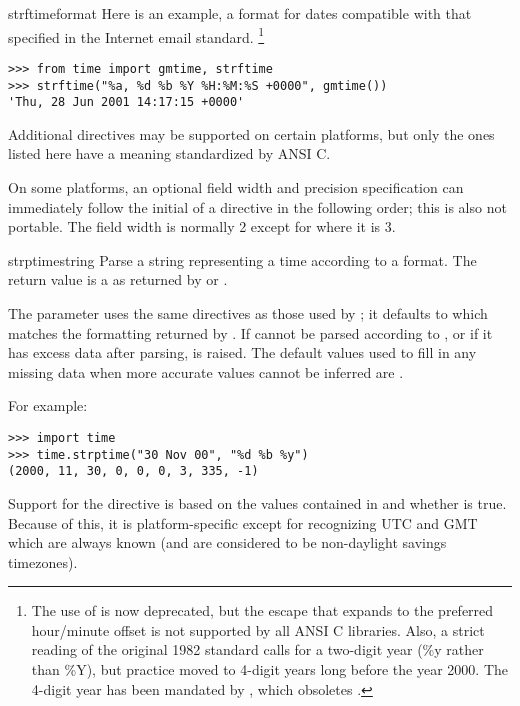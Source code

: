 \begin{funcdesc}{strftime}{format}
Here is an example, a format for dates compatible with that specified 
in the  Internet email standard.
	\footnote{The use of  is now
	deprecated, but the  escape that expands to the preferred 
	hour/minute offset is not supported by all ANSI C libraries. Also,
	a strict reading of the original 1982  standard calls for
	a two-digit year (\%y rather than \%Y), but practice moved to
	4-digit years long before the year 2000.  The 4-digit year has
        been mandated by , which obsoletes .}

\begin{verbatim}
>>> from time import gmtime, strftime
>>> strftime("%a, %d %b %Y %H:%M:%S +0000", gmtime())
'Thu, 28 Jun 2001 14:17:15 +0000'
\end{verbatim}

Additional directives may be supported on certain platforms, but
only the ones listed here have a meaning standardized by ANSI C.

On some platforms, an optional field width and precision
specification can immediately follow the initial \character{\%} of a
directive in the following order; this is also not portable.
The field width is normally 2 except for  where it is 3.
\end{funcdesc}

\begin{funcdesc}{strptime}{string}
Parse a string representing a time according to a format.  The return 
value is a  as returned by  or
.  

The  parameter uses the same directives as those used by
; it defaults to  which matches the formatting returned by .
If  cannot be parsed according to , or if it
has excess data after parsing,  is raised.  The
default values used to fill in any missing data when more accurate
values cannot be inferred are .

For example:

\begin{verbatim}
>>> import time
>>> time.strptime("30 Nov 00", "%d %b %y")
(2000, 11, 30, 0, 0, 0, 3, 335, -1)
\end{verbatim}

Support for the  directive is based on the values contained in
 and whether  is true.  Because of this,
it is platform-specific except for recognizing UTC and GMT which are
always known (and are considered to be non-daylight savings
timezones).
\end{funcdesc}

